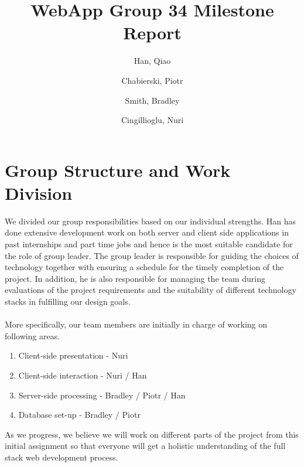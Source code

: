 \documentclass[10pt,a4paper]{article}
\begin{document}
\title{WebApp Group 34 Milestone Report}
\author{
  Han, Qiao\\
  \and
  Chabierski, Piotr\\
  \and
  Smith, Bradley\\
  \and
  Cingillioglu, Nuri\\
}

\maketitle

\section{Group Structure and Work Division}

\noindent
We divided our group responsibilities based on our individual strengths. Han has done extensive development work on both server and client side applications in past internships and part time jobs and hence is the most suitable candidate for the role of group leader. The group leader is responsible for guiding the choices of technology together with ensuring a schedule for the timely completion of the project. In addition, he is also responsible for managing the team during evaluations of the project requirements and the suitability of different technology stacks in fulfilling our design goals.
\\
\\
\noindent
More specifically, our team members are initially in charge of working on following areas.

\begin{enumerate}
  \item Client-side presentation - Nuri
  \item Client-side interaction - Nuri / Han
  \item Server-side processing - Bradley / Piotr / Han
  \item Database set-up - Bradley / Piotr
\end{enumerate}

\noindent
As we progress, we believe we will work on different parts of the project from this initial assignment so that everyone will get a holistic understanding of the full stack web development process.
\end{document}
